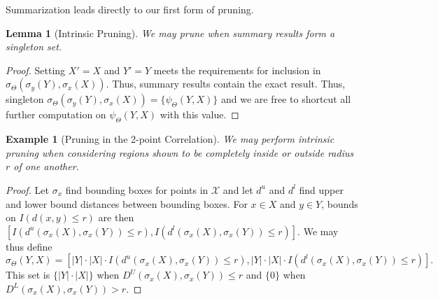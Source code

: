 \documentclass{article}
\newtheorem{lemma}{Lemma}
\newtheorem{example} {Example}
\newcommand{\GNP}[1][\psi]{{#1}_{\Theta}}
\newcommand{\disthrectmin}{d^{l}}
\newcommand{\disthrectmax}{d^{u}}
\begin{document}

Summarization leads directly to our first form of pruning.
\begin{lemma}[Intrinsic Pruning]
  We may prune when summary results form a singleton set.
\end{lemma}
\begin{proof}
  Setting $X' = X$ and $Y' = Y$ meets the requirements for inclusion
  in $\GNP[\sigma](\sigma_y(Y),\sigma_x(X))$.  Thus, summary results
  contain the exact result.  Thus, singleton
  $\GNP[\sigma](\sigma_y(Y),\sigma_x(X)) = \{\GNP(Y,X)\}$ and we are
  free to shortcut all further computation on $\GNP(Y,X)$ with this
  value.
\end{proof}

\begin{example}[Pruning in the 2-point Correlation]
  We may perform intrinsic pruning when considering regions shown to
  be completely inside or outside radius $r$ of one another.
\end{example}
\begin{proof}
  Let $\sigma_x$ find bounding boxes for points in $\mathcal{X}$ and
  let $\disthrectmax$ and $\disthrectmin$ find upper and lower bound
  distances between bounding boxes.  For $x \in X$ and $y \in Y$,
  bounds on $I(d(x,y) \leq r)$ are then $\left[
  I(\disthrectmax(\sigma_x(X),\sigma_x(Y)) \leq r),
  I(\disthrectmin(\sigma_x(X),\sigma_x(Y)) \leq r) \right]$.  We may thus
  define
  \[
  \GNP[\sigma](Y,X) = \left[ |Y| \cdot |X| \cdot I(\disthrectmax(\sigma_x(X),\sigma_x(Y)) \leq r), |Y| \cdot |X| \cdot I(\disthrectmin(\sigma_x(X),\sigma_x(Y)) \leq r) \right].
  \]
  This set is $\{|Y| \cdot |X|\}$ when
  $D^{\!U}(\sigma_x(X),\sigma_x(Y)) \leq r$ and $\{0\}$ when
  $D^{\!L}(\sigma_x(X),\sigma_x(Y)) > r$.
\end{proof}

\end{document}
